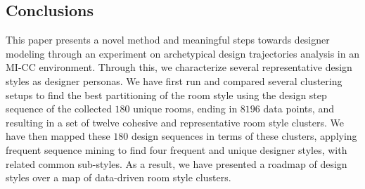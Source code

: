 \subsection{Conclusions}







This paper presents a novel method and meaningful steps towards designer modeling through an experiment on archetypical design trajectories analysis in an MI-CC environment. Through this, we characterize several representative design styles as designer personas. We have first run and compared several clustering setups to find the best partitioning of the room style using the design step sequence of the collected $180$ unique rooms, ending in $8196$ data points, and resulting in a set of twelve cohesive and representative room style clusters. We have then mapped these $180$ design sequences in terms of these clusters, applying frequent sequence mining to find four frequent and unique designer styles, with related common sub-styles. As a result, we have presented a roadmap of design styles over a map of data-driven room style clusters. 

